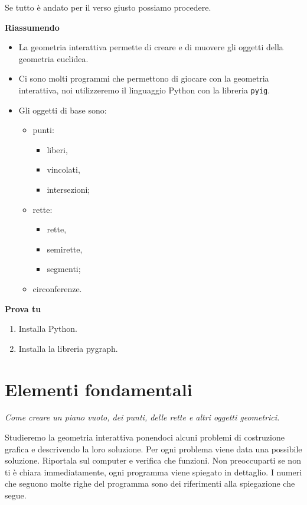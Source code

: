 Se tutto è andato per il verso giusto possiamo procedere.

\textbf{Riassumendo}
\begin{itemize} [noitemsep]
\item La geometria interattiva permette di creare e di muovere gli oggetti 
della geometria euclidea.

\item Ci sono molti programmi che permettono di giocare con la geometria
interattiva, noi utilizzeremo il linguaggio Python con la libreria 
\texttt{pyig}.

\item Gli oggetti di base sono:
\begin{itemize} [noitemsep]
\item punti:
\begin{itemize} [noitemsep]
\item liberi,
\item vincolati,
\item intersezioni;
\end{itemize}

\item rette:
\begin{itemize} [noitemsep]
\item rette,
\item semirette,
\item segmenti;
\end{itemize}
\item circonferenze.
\end{itemize}
\end{itemize}

\textbf{Prova tu}
\begin{enumerate} [noitemsep]
\item Installa Python.
\item Installa la libreria pygraph.
\end{enumerate}


\section{Elementi fondamentali}
\label{sec:geo_int_elementi_fondamentali}
\emph{Come creare un piano vuoto, dei punti, delle rette e altri
oggetti geometrici.}

Studieremo la geometria interattiva ponendoci alcuni problemi di costruzione 
grafica e descrivendo la loro soluzione. Per ogni problema viene data una 
possibile soluzione. Riportala sul computer e verifica che funzioni. Non 
preoccuparti se non ti è chiara immediatamente, ogni programma viene spiegato 
in dettaglio. 
I numeri che seguono molte righe del programma sono dei riferimenti alla 
spiegazione che segue.

